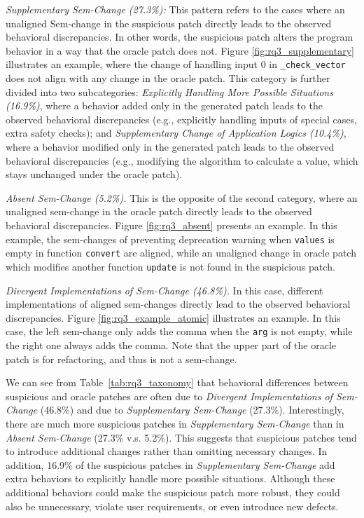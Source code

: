  \textit{Supplementary Sem-Change (27.3\%):} This pattern refers to the cases where an unaligned Sem-change in the suspicious patch directly leads to the observed behavioral discrepancies.
%
In other words, the suspicious patch alters the program behavior in a way that the oracle patch does not.
Figure \ref{fig:rq3_supplementary} illustrates an example, where the change of handling input 0 in \verb|_check_vector| does not align with any change in the oracle patch. 
%
This category is further divided into two subcategories: 
\emph{Explicitly Handling More Possible Situations (16.9\%)}, where a behavior added only in the generated patch leads to the observed behavioral discrepancies (e.g., explicitly handling inputs of special cases, extra safety checks); 
and \emph{Supplementary Change of Application Logics (10.4\%)}, where a behavior modified only in the generated patch leads to the observed behavioral discrepancies (e.g., modifying the algorithm to calculate a value, which stays unchanged under the oracle patch). 


 \textit{Absent Sem-Change (5.2\%).} This is the opposite of the second category, where an unaligned sem-change in the oracle patch directly leads to the observed behavioral discrepancies.
Figure \ref{fig:rq3_absent} presents an example.
In this example, the sem-changes of preventing deprecation warning when \verb|values| is empty in function \verb|convert| are aligned,
while an unaligned change in oracle patch which modifies another function \verb|update| is not found in the suspicious patch. 

 \textit{Divergent Implementations of Sem-Change (46.8\%).} In this case, different implementations of aligned sem-changes directly lead to the observed behavioral discrepancies. 
Figure \ref{fig:rq3_example_atomic} illustrates an example.
In this case, the left sem-change only adds the comma when the \verb|arg| is not empty, while the right one always adds the comma. 
Note that the upper part of the oracle patch is for refactoring, and thus is not a sem-change. 

We can see from Table~\ref{tab:rq3_taxonomy} that behavioral differences between suspicious and oracle patches are often due to \emph{Divergent Implementations of Sem-Change} (46.8\%) and due to \emph{Supplementary Sem-Change} (27.3\%).
Interestingly, there are much more suspicious patches in \emph{Supplementary Sem-Change} than in \emph{Absent Sem-Change} (27.3\% v.s. 5.2\%).
This suggests that suspicious patches tend to introduce additional changes rather than omitting necessary changes. 
In addition, 
16.9\% of the suspicious patches in \emph{Supplementary Sem-Change} add extra behaviors to explicitly handle more possible situations. 
Although these additional behaviors could make the suspicious patch more robust, they could also be unnecessary, violate user requirements, or even introduce new defects.

